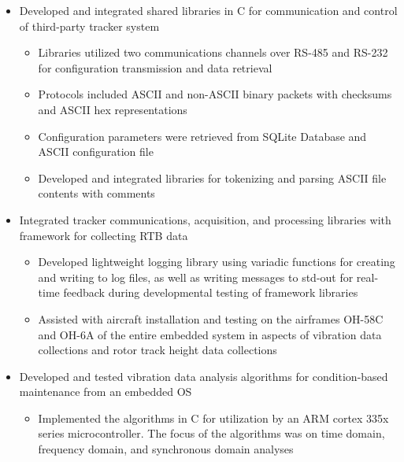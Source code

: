 \documentclass[10pt,a4paper]{article}
\begin{document}
\begin{itemize}
  \item Developed and integrated shared libraries in C for communication and control of
    third-party tracker system
    \begin{itemize}
      \item Libraries utilized two communications channels over RS-485 and RS-232 for
        configuration transmission and data retrieval

      \item Protocols included ASCII and non-ASCII binary packets with checksums and
        ASCII hex representations

      \item Configuration parameters were retrieved from SQLite Database and ASCII
        configuration file

      \item Developed and integrated libraries for tokenizing and parsing ASCII file
        contents with comments
    \end{itemize}

  \item Integrated tracker communications, acquisition, and processing libraries with
    framework for collecting RTB data
    \begin{itemize}
      \item Developed lightweight logging library using variadic functions for creating
        and writing to log files, as well as writing messages to std-out for real-time
        feedback during developmental testing of framework libraries

      \item Assisted with aircraft installation and testing on the airframes OH-58C and
        OH-6A of the entire embedded system in aspects of vibration data collections and
        rotor track height data collections
    \end{itemize}

  \item Developed and tested vibration data analysis algorithms for condition-based
    maintenance from an embedded OS
    \begin{itemize}
      \item Implemented the algorithms in C for utilization by an ARM cortex 335x series
        microcontroller. The focus of the algorithms was on time domain, frequency
        domain, and synchronous domain analyses


\end{itemize}
\end{itemize}
\end{document}

